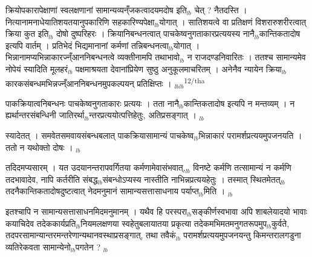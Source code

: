 \documentclass[article,12pt,a4paper]{memoir}%
\newcounter{parCount}
\begin{document}
	  
	  \pstart \leavevmode%
	क्रियोपकारापेक्षाणां स्वलक्षणानां सामान्यव्यन्ँजकत्वादयमदोष इति{\tiny $_{lb}$} चेत् ? नैतदस्ति । नित्यानामनाधेयातिशयतयानुपकारिणि सहकारिण्यपेक्षा{\tiny $_{lb}$}योगात् । सातिशयत्वे वा प्रतिक्षणं विशरारुशरीरत्वात् क्रिया कुत इति{\tiny $_{lb}$} दोषो दुष्परिहरः । क्रियानिबन्धनत्वात् पाचकेष्वनुगताकारप्रत्ययस्य नानै{\tiny $_{lb}$}कान्तिकतादोष इत्यपि वार्तम् । प्रतिभेदं भिद्यमानानां कर्मणां तन्निबन्धनत्वा{\tiny $_{lb}$}योगात् । भिन्नानामप्यभिन्नाकारज्न्ँआननिबन्धनत्वे व्यक्तीनामपि तथाभावो{\tiny $_{lb}$} न राजदण्डनिवारितः । ततश्च सामान्यमेव नोपेयं स्यादिति मूलहरं{\tiny $_{lb}$} पक्षमाश्रयता देवानांप्रियेण सुष्ठु अनुकूलमाचरितम् । अनेनैव न्यायेन क्रिया{\tiny $_{lb}$}कारकसंबन्धमभिन्नज्न्ँआननिबन्धनमुपकल्पयन् प्रतिक्षिप्तः ।
	{}
	\pend%
      {\tiny $_{lb}$}{\tiny $_{lb}$}\textsuperscript{\textenglish{12/tha}}

	  
	  \pstart \leavevmode%
	पाकक्रियात्वनिबन्धनः पाचकेष्वनुगताकारः प्रत्ययः । तता नानै{\tiny $_{lb}$}कान्तिकतादोष इत्यपि न मन्तव्यम् । न ह्यर्थान्तरसंबन्धिनी जातिरर्था{\tiny $_{lb}$}न्तरप्रत्ययोत्पत्तिहेतुः, अतिप्रसङ्गात् ।
	{}
	\pend%
      {\tiny $_{lb}$}

	  
	  \pstart \leavevmode%
	स्यादेतत् । समवेतसमवायसंबन्धबलात् पाकक्रियासामान्यं पाचकेष्व{\tiny $_{lb}$}भिन्नाकारं परामर्शप्रत्ययमुपजनयति । ततो न यथोक्तो दोषः ।
	{}
	\pend%
      {\tiny $_{lb}$}

	  
	  \pstart \leavevmode%
	तदिदमप्यसारम् । यत उदयानन्तरापवर्गितया कर्मणामेवासंभवात्,{\tiny $_{lb}$} विनष्टे कर्मणि तत्सामान्यं न कर्मणि तदभावादेव, नापि कर्तरीति संबद्ध{\tiny $_{lb}$}संबन्धोऽप्यस्य नास्तीति नाभिन्नप्रत्ययहेतुः । तस्मात् स्थितमेतत्{\tiny $_{lb}$} तदनैकान्तिकतादोषदुष्टत्वात् नेदमनुमानं सामान्यसत्तासाधनाय पर्याप्त{\tiny $_{lb}$}मिति ।
	{}
	\pend%
      {\tiny $_{lb}$}

	  
	  \pstart \leavevmode%
	इतश्चापि न सामान्यसत्तासाधनमिदमनुमानम् । यथैव हि परस्परा{\tiny $_{lb}$}सङ्कीर्णस्वभावा अपि शाबलेयादयो भावाः कयाचिदेव तदेककार्यप्रति{\tiny $_{lb}$}नियमलक्षणया स्वहेतुबलायातया प्रकृत्या तदेकमभिमतमनुगतरूपमुप{\tiny $_{lb}$}कुर्वते, तदपरसामान्यान्तरमन्तरेणान्यथानवस्थाप्रसङ्गात्, तथा तवैकं{\tiny $_{lb}$} परामर्शप्रत्ययमुपजनयन्तु किमन्तरालगडुना व्यतिरेकवता सामान्येनो{\tiny $_{lb}$}पगतेन ?
	{}
	\pend%
      {\tiny $_{lb}$}
\end{document}
